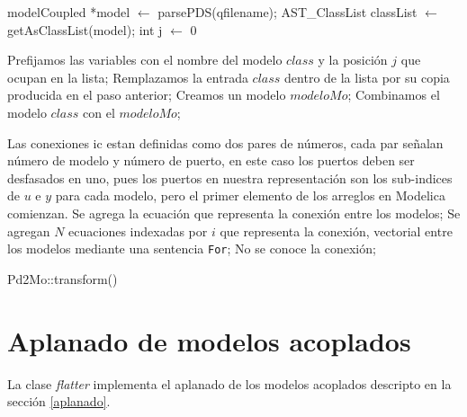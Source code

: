 \begin{algorithm}[H]
\begin{algorithmic}[1]
\State modelCoupled *model $\gets$ parsePDS(qfilename);
\State AST\_ClassList classList $\gets$ getAsClassList(model); 
\State int j $\gets$ 0\;

 		\State Prefijamos las variables con el nombre del modelo $class$ y la posición $j$ que ocupan en la lista;
 		\State Remplazamos la entrada $class$ dentro de la lista por su copia producida en el paso anterior;
 	\EndIf
\EndFor
\State Creamos un modelo $modeloMo$;
 	\State Combinamos el modelo $class$ con el $modeloMo$;
\EndFor

	\State Las conexiones ic estan definidas como dos pares de números, cada par señalan número  de modelo y número de puerto, en este caso los puertos deben ser desfasados en uno, pues los puertos en nuestra representación son los sub-indices de $u$ e $y$ para cada modelo, pero el primer elemento de los arreglos en Modelica comienzan.
  		\State Se agrega la ecuación que representa la conexión entre los modelos;
  		\State Se agregan $N$ ecuaciones indexadas por $i$ que representa la conexión, vectorial entre los modelos mediante una sentencia \texttt{For};
  	\Else
  		\State No se conoce la conexión;
	\EndIf
\EndFor
\end{algorithmic}
 \caption{Pd2Mo::transform()}
\end{algorithm}

\section{Aplanado de modelos acoplados}
La clase \emph{flatter} implementa el aplanado de los modelos acoplados descripto en la sección \ref{aplanado}.
 
